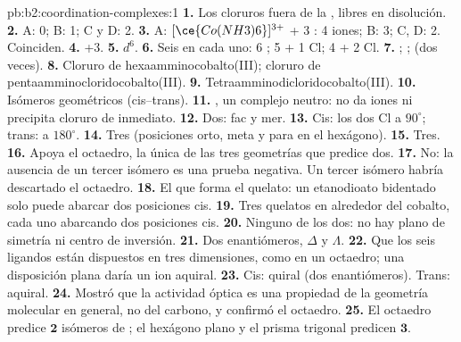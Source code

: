 \begin{solution}{pb:b2:coordination-complexes:1}
\textbf{1.} Los cloruros fuera de la , libres en disolución.
\textbf{2.} A: 0; B: 1; C y D: 2.
\textbf{3.} A: $[\ce{Co(NH3)6}]^{3+}$ + 3 : 4 iones; B: 3; C, D: 2. Coinciden.
\textbf{4.} +3.
\textbf{5.} $d^6$.
\textbf{6.} Seis en cada uno: 6 ; 5  + 1 Cl; 4  + 2 Cl.
\textbf{7.} ; ;  (dos veces).
\textbf{8.} Cloruro de hexaamminocobalto(III); cloruro de pentaamminocloridocobalto(III).
\textbf{9.} Tetraamminodicloridocobalto(III).
\textbf{10.} Isómeros geométricos (cis--trans).
\textbf{11.} \ce{[CoCl3(NH3)3]}, un complejo neutro: no da iones ni precipita cloruro de
inmediato.
\textbf{12.} Dos: fac y mer.
\textbf{13.} Cis: los dos Cl a $90^\circ$; trans: a $180^\circ$.
\textbf{14.} Tres (posiciones orto, meta y para en el hexágono).
\textbf{15.} Tres.
\textbf{16.} Apoya el octaedro, la única de las tres geometrías que predice dos.
\textbf{17.} No: la ausencia de un tercer isómero es una prueba negativa. Un tercer isómero
habría descartado el octaedro.
\textbf{18.} El que forma el quelato: un etanodioato bidentado solo puede abarcar dos
posiciones cis.
\textbf{19.} Tres quelatos en alrededor del cobalto, cada uno abarcando dos posiciones cis.
\textbf{20.} Ninguno de los dos: no hay plano de simetría ni centro de inversión.
\textbf{21.} Dos enantiómeros, $\Delta$ y $\Lambda$.
\textbf{22.} Que los seis ligandos están dispuestos en tres dimensiones, como en un
octaedro; una disposición plana daría un ion aquiral.
\textbf{23.} Cis: quiral (dos enantiómeros). Trans: aquiral.
\textbf{24.} Mostró que la actividad óptica es una propiedad de la geometría molecular en general,
no del carbono, y confirmó el octaedro.
\textbf{25.} El octaedro predice $\boldsymbol{2}$ isómeros de \ce{[CoCl2(NH3)4]+}; el
hexágono plano y el prisma trigonal predicen $\boldsymbol{3}$.
\end{solution}
